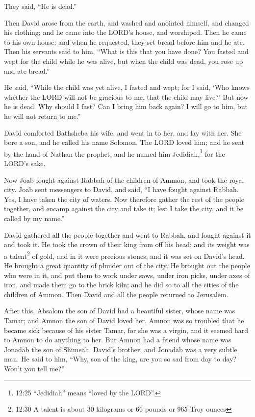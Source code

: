 They said, “He is dead.”

\myverse{}Then David arose from the earth, and washed and anointed himself,
and changed his clothing; and he came into the LORD’s house, and worshiped. Then he came to his own house;
and when he requested, they set bread before him and he ate.
\myverse{}Then his servants said to him, “What is this that you have done? You fasted
and wept for the child while he was alive, but when the child was dead, you rose up and ate bread.”

\myverse{}He said, “While the child was yet alive, I fasted and wept;
for I said, ‘Who knows whether the LORD will not be gracious to me, that the child may live?’
\myverse{}But now he is dead. Why should I fast? Can I bring him back again? I will
go to him, but he will not return to me.”

\myverse{}David comforted Bathsheba his wife, and went in to her, and
lay with her. She bore a son, and he called his name Solomon. The LORD loved him;
\myverse{}and he sent by the hand of Nathan the prophet, and he named him Jedidiah,\footnote{12:25 “Jedidiah” means “loved by the LORD”.} for the LORD’s sake.

\myverse{}Now Joab fought against Rabbah of the children of Ammon, and
took the royal city.
\myverse{}Joab sent messengers to David, and said, “I have fought against Rabbah. Yes,
I have taken the city of waters.
\myverse{}Now therefore gather the rest of the people together, and encamp against
the city and take it; lest I take the city, and it be called by my name.”

\myverse{}David gathered all the people together and went to Rabbah, and
fought against it and took it.
\myverse{}He took the crown of their king from off his head; and its weight was a talent\footnote{12:30 A talent is about 30 kilograms or 66 pounds or 965 Troy ounces} of gold, and in it were
precious stones; and it was set on David’s head. He brought a great quantity of plunder out of the city.
\myverse{}He brought out the people who were in it, and put them to work under saws,
under iron picks, under axes of iron, and made them go to the brick kiln; and he did so to all the cities
of the children of Ammon. Then David and all the people returned to Jerusalem.


\mychapter{} \myverse*{}After this, Absalom the son of David had a beautiful sister, whose
name was Tamar; and Amnon the son of David loved her.
\myverse{}Amnon was so troubled that he became sick because of his sister Tamar, for
she was a virgin, and it seemed hard to Amnon to do anything to her.
\myverse{}But Amnon had a friend whose name was Jonadab the son of Shimeah, David’s brother;
and Jonadab was a very subtle man.
\myverse{}He said to him, “Why, son of the king, are you so sad from day to day? Won’t
you tell me?”

